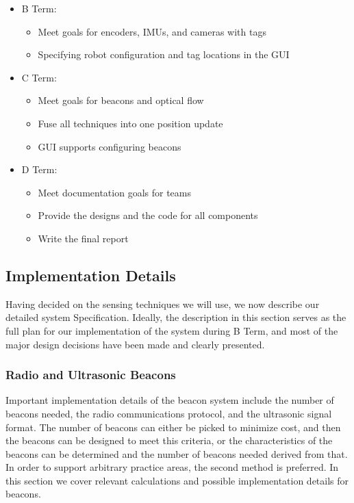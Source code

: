 \documentclass{article}
\begin{document}
    \begin{itemize}
      \item B Term:
      \begin{itemize}
        \item Meet goals for encoders, IMUs, and cameras with tags
        \item Specifying robot configuration and tag locations in the GUI
      \end{itemize}
      \item C Term:
      \begin{itemize}
        \item Meet goals for beacons and optical flow
        \item Fuse all techniques into one position update
        \item GUI supports configuring beacons
      \end{itemize}
      \item D Term:
      \begin{itemize}
        \item Meet documentation goals for teams
        \item Provide the designs and the code for all components
        \item Write the final report
      \end{itemize}
    \end{itemize}

  \subsection{Implementation Details}

    Having decided on the sensing techniques we will use, we now describe our detailed system Specification. Ideally, the description in this section serves as the full plan for our implementation of the system during B Term, and most of the major design decisions have been made and clearly presented.

    \subsubsection{Radio and Ultrasonic Beacons}

      Important implementation details of the beacon system include the number of beacons needed, the radio communications protocol, and the ultrasonic signal format. The number of beacons can either be picked to minimize cost, and then the beacons can be designed to meet this criteria, or the characteristics of the beacons can be determined and the number of beacons needed derived from that. In order to support arbitrary practice areas, the second method is preferred. In this section we cover relevant calculations and possible implementation details for beacons. \\
\end{document}
